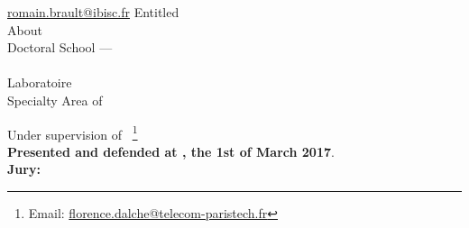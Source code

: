 \begin{titlepage}
\begin{addmargin}[-1cm]{-3cm}
\begin{center}
{                \href{mailto:romain.brault@ibisc.fr}{romain.brault@ibisc.fr}}
            \endgroup
            \bigskip\vfill
            \begingroup
                Entitled \\ \smallskip {\Huge \color{PSaclay}\textsc{\myTitle}}
            \endgroup
            \bigskip
            \vfill
            \begingroup
                About \\ {\Large \textbf{\textsc{\mySubtitle}}}
            \endgroup
            \bigskip
            \vfill
            \begingroup
                Doctoral School --- \EDN\\
                \myDoctoralSchool\\
                Laboratoire \myFaculty\\
                Specialty Area of \myDepartment%
                \medskip
            \endgroup
        \end{center}
        \vspace{1cm}
        \vfill
        \noindent Under supervision of
        \mySupervisorDegree~\textsc{\mySupervisor}\footnote{Email:
        \href{mailto:florence.dalche@telecom-paristech.fr}%
        {florence.dalche@telecom-paristech.fr}}\\
        \smallskip
        \noindent \textbf{Presented and defended at \myUniUEVE, the 1st of
        March 2017}. \\
        \smallskip
        \noindent \textbf{Jury:}

\end{addmargin}
\end{titlepage}
